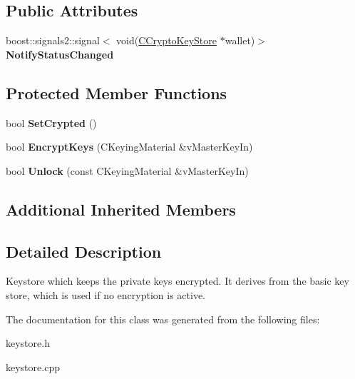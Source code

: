 \subsection*{Public Attributes}
\begin{DoxyCompactItemize}
\item 
\mbox{\label{class_c_crypto_key_store_a251b9ed228a19ab39d542985b425fc85}} 
boost\+::signals2\+::signal$<$ void(\mbox{\hyperlink{class_c_crypto_key_store}{C\+Crypto\+Key\+Store}} $\ast$wallet)$>$ {\bfseries Notify\+Status\+Changed}
\end{DoxyCompactItemize}
\subsection*{Protected Member Functions}
\begin{DoxyCompactItemize}
\item 
\mbox{\label{class_c_crypto_key_store_af202f587051735be5a39344d9e333720}} 
bool {\bfseries Set\+Crypted} ()
\item 
\mbox{\label{class_c_crypto_key_store_a8c0f6b63fb04193df16243c4459b7c61}} 
bool {\bfseries Encrypt\+Keys} (C\+Keying\+Material \&v\+Master\+Key\+In)
\item 
\mbox{\label{class_c_crypto_key_store_a81bd70e18aa75f566526620a74f9cd88}} 
bool {\bfseries Unlock} (const C\+Keying\+Material \&v\+Master\+Key\+In)
\end{DoxyCompactItemize}
\subsection*{Additional Inherited Members}


\subsection{Detailed Description}
Keystore which keeps the private keys encrypted. It derives from the basic key store, which is used if no encryption is active. 

The documentation for this class was generated from the following files\+:\begin{DoxyCompactItemize}
\item 
keystore.\+h\item 
keystore.\+cpp\end{DoxyCompactItemize}
